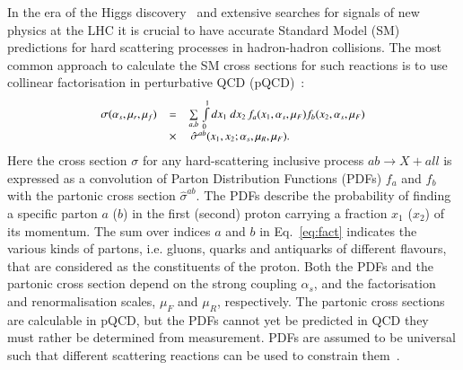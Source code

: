 In the era of the Higgs discovery~\cite{Aad:2012tfa,Chatrchyan:2012ufa} and extensive searches
for signals of new physics at the LHC it is crucial
to have accurate Standard Model (SM) predictions for
hard scattering processes in hadron-hadron collisions.
The most common approach to calculate the SM cross sections for  
such reactions is to use collinear factorisation in perturbative QCD (pQCD)~\cite{Collins:1989}:
\begin{equation}
\small
\begin{array}{lcl}
\sigma(\alpha_s,\mu_r,\mu_f) & = &
\sum\limits_{a,b}\,  \int\limits_{0}\limits^{1} dx_1\ dx_2\, f_a(x_1,\alpha_s,\mu_F) 
 f_b(x_2,\alpha_s,\mu_F)\\ 
& \times & \, \hat{\sigma}^{ab}(x_1,x_2;\alpha_s,\mu_R,\mu_F).
\label{eq:fact}
\end{array}
\end{equation}
Here the cross section $\sigma$ for 
any hard-scattering inclusive process $ab \rightarrow X + all$
is expressed
as a convolution of Parton Distribution Functions (PDFs) $f_a$ and $f_b$
with the partonic cross section
$\hat{\sigma}^{ab}$.
%
The PDFs describe 
the probability of finding a specific parton $a$ ($b$) in the first (second) proton carrying a fraction $x_1$ ($x_2$) of its momentum.
%
The sum over indices $a$ and $b$ in Eq.~\ref{eq:fact} indicates the various 
kinds of partons,
i.e. gluons, quarks and antiquarks of different flavours, 
that are considered
as the constituents of the proton.
%
Both the PDFs and the partonic cross section depend on the strong coupling
$\alpha_s$, and the factorisation and renormalisation scales,
$\mu_F$ and $\mu_R$, respectively.
%
The partonic cross sections are calculable in pQCD, but
the PDFs cannot yet be predicted in QCD 
they must rather be determined from measurement. 
%
PDFs are assumed to be universal such that different scattering reactions can be used 
to constrain them~\cite{Perez:2012um,Forte:2013wc}.
%

